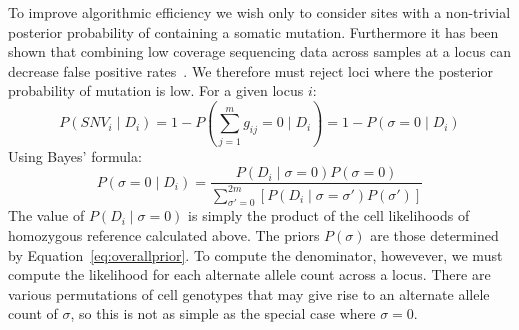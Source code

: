 \documentclass[../../main.tex]{subfiles}
\begin{document}
To improve algorithmic efficiency we wish only to consider sites with a non-trivial posterior probability of containing a somatic mutation. Furthermore it has been shown that combining low coverage sequencing data across samples at a locus can decrease false positive rates~\cite{ledurbin}. We therefore must reject loci where the posterior probability of mutation is low. For a given locus $i$:
\begin{equation}
P(SNV_i\mid D_i) = 1- P\left(\sum_{j=1}^m g_{ij} = 0 \mid D_i\right) = 1-P(\sigma = 0 \mid D_i)
\end{equation}
Using Bayes' formula:
\begin{equation}\label{eq:sitebayes}
P\left(\sigma = 0 \mid D_i\right) = \frac{P(D_i\mid \sigma = 0)P(\sigma = 0)}{\sum_{\sigma'=0}^{2m}[P(D_i\mid \sigma=\sigma')P(\sigma')]}
\end{equation}
The value of $P(D_i\mid \sigma = 0)$ is simply the product of the cell likelihoods of homozygous reference calculated above. The priors $P(\sigma)$ are those determined by Equation~\eqref{eq:overallprior}. To compute the denominator, howevever, we must compute the likelihood for each alternate allele count across a locus. There are various permutations of cell genotypes that may give rise to an alternate allele count of $\sigma$, so this is not as simple as the special case where $\sigma=0$.\\
\end{document}
